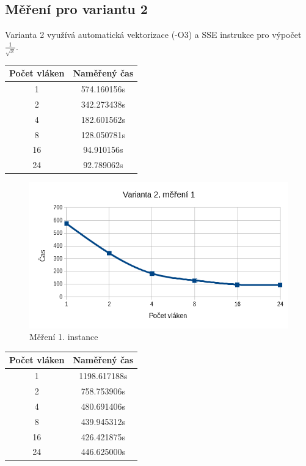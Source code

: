 \documentclass[12pt]{article}
\begin{document}
\subsection{Měření pro variantu 2}
Varianta 2 využívá automatická vektorizace (-O3) a SSE instrukce pro výpočet ${\frac{1}{\sqrt{x}}}$.

\begin{center}
\begin{tabular}{ c | c }
\textbf{Počet vláken} & \textbf{Naměřený čas} \\ \hline \hline 
1 & 574.160156s \\ \hline
2 & 342.273438s \\ \hline
4 & 182.601562s \\ \hline
8 & 128.050781s \\ \hline
16 & 94.910156s \\ \hline
24 & 92.789062s \\ \hline
\end{tabular}
\end{center}

\begin{figure}
  \begin{center}
     \includegraphics[width=12cm]{images/sse1.png}
    \caption{Měření 1. instance} 
  \end{center}
\end{figure}

\begin{center}
\begin{tabular}{ c | c }
\textbf{Počet vláken} & \textbf{Naměřený čas} \\ \hline \hline 
1 & 1198.617188s \\ \hline
2 & 758.753906s \\ \hline
4 & 480.691406s \\ \hline
8 & 439.945312s \\ \hline
16 & 426.421875s \\ \hline
24 & 446.625000s \\ \hline
\end{tabular}
\end{center}
\end{document}
